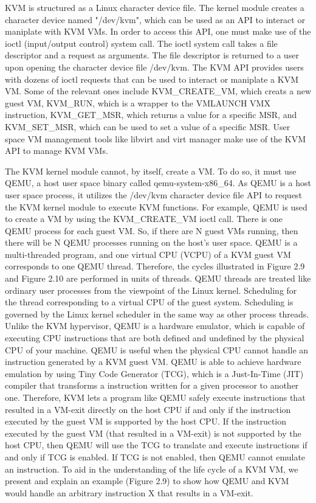 \documentclass{report}
\begin{document}
\begin{spacing}{1.5}
{\large
KVM is structured as a Linux character device file. The kernel module creates a character device named "/dev/kvm", which can be used as an API to interact or maniplate with KVM VMs. In order to access this API, one must make use of the ioctl (input/output control) system call. The ioctl system call takes a file descriptor and a request as arguments. The file descriptor is returned to a user upon opening the character device file /dev/kvm. The KVM API provides users with dozens of ioctl requests that can be used to interact or maniplate a KVM VM. Some of the relevant ones include KVM\_CREATE\_VM, which creats a new guest VM, KVM\_RUN, which is a wrapper to the VMLAUNCH VMX instruction, KVM\_GET\_MSR, which returns a value for a specific MSR, and KVM\_SET\_MSR, which can be used to set a value of a specific MSR. User space VM management tools like libvirt and virt manager make use of the KVM API to manage KVM VMs.
\newline}


{\large
The KVM kernel module cannot, by itself, create a VM. To do so, it must use QEMU, a host user space binary called qemu-system-x86\_64. As QEMU is a host user space process, it utilizes the /dev/kvm character device file API to request the KVM kernel module to execute KVM functions. For example, QEMU is used to create a VM by using the KVM\_CREATE\_VM ioctl call. There is one QEMU process for each guest VM. So, if there are N guest VMs running, then there will be N QEMU processes running on the host's user space. QEMU is a multi-threaded program, and one virtual CPU (VCPU) of a KVM guest VM corresponds to one QEMU thread. Therefore, the cycles illustrated in Figure 2.9 and Figure 2.10 are performed in units of threads. QEMU threads are treated like ordinary user processes from the viewpoint of the Linux kernel. Scheduling for the thread corresponding to a virtual CPU of the guest system. Scheduling is governed by the Linux kernel scheduler in the same way as other process threads. Unlike the KVM hypervisor, QEMU is a hardware emulator, which is capable of executing CPU instructions that are both defined and undefined by the physical CPU of your machine. QEMU is useful when the physical CPU cannot handle an instruction generated by a KVM guest VM. QEMU is able to achieve hardware emulation by using Tiny Code Generator (TCG), which is a Just-In-Time (JIT) compiler that transforms a instruction written for a given processor to another one. Therefore, KVM lets a program like QEMU safely execute instructions that resulted in a VM-exit directly on the host CPU if and only if the instruction executed by the guest VM is supported by the host CPU. If the instruction executed by the guest VM (that resulted in a VM-exit) is not supported by the host CPU, then QEMU will use the TCG to translate and execute instructions if and only if TCG is enabled. If TCG is not enabled, then QEMU cannot emulate an instruction. To aid in the understanding of the life cycle of a KVM VM, we present and explain an example (Figure 2.9) to show how QEMU and KVM would handle an arbitrary instruction X that results in a VM-exit.
\newline
}


\end{spacing}
\end{document}
